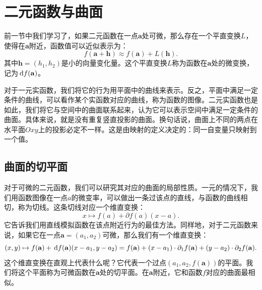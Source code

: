 \documentclass[12pt,UTF8,fontset=none]{ctexbook}
\begin{document}
\chapter{二元函数与曲面}

前一节中我们学习了，如果二元函数在一点$\mathbf{a}$处可微，那么存在一个平直变换$L$，使得在$\mathbf{a}$附近，函数值可以近似表示为：
$$ f(\mathbf{a} + \mathbf{h}) \approx f(\mathbf{a}) + L(\mathbf{h}). $$
其中$\mathbf{h} = (h_1,h_2)$是小的向量变化量。这个平直变换$L$称为函数在$\mathbf{a}$处的微变换，记为$\,\mathrm{d} f(\mathbf{a})$。

对于一元实函数，我们将它的行为用平面中的曲线来表示。反之，平面中满足一定条件的曲线，可以看作某个实函数对应的曲线，称为函数的图像。二元实函数也是如此，我们将它与空间中的曲面联系起来，认为它可以表示空间中满足一定条件的曲面。具体来说，就是没有重复竖直投影的曲面。换句话说，曲面上不同的两点在水平面$Oxy$上的投影必定不一样。这是由映射的定义决定的：同一自变量只映射到一个值。

\section{曲面的切平面}

对于可微的二元函数，我们可以研究其对应的曲面的局部性质。一元的情况下，我们用函数图像在一点$a$的微变率，可以做出一条过该点的直线，与函数的曲线相切，称为切线。这条切线对应一个维直变换：
$$ x\mapsto f(a) + \partial f(a) (x - a).$$
它告诉我们用直线模拟函数在该点附近行为的最佳方法。同样地，对于二元函数来说，如果它在一点$\mathbf{a} = (a_1, a_2)$可微，那么我们有一个维直变换：
$$ (x, y) \mapsto f(\mathbf{a}) + \,\mathrm{d} f(\mathbf{a}) (x - a_1, y - a_2) = f(\mathbf{a}) + (x - a_1)\cdot\partial_1 f(\mathbf{a}) + (y - a_2)\cdot\partial_2 f(\mathbf{a}) .$$
这个维直变换在直观上代表什么呢？它代表一个过点$(a_1, a_2, f(\mathbf{a}))$的平面。我们将这个平面称为可微函数在$\mathbf{a}$处的切平面。在$\mathbf{a}$附近，它和函数$f$对应的曲面最相似。
\end{document}
